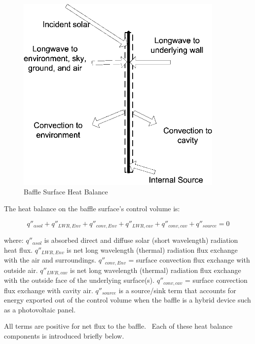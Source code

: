 \begin{figure}[hbtp] %
\centering
\includegraphics[width=0.9\textwidth, height=0.9\textheight, keepaspectratio=true]{media/image438.png}
\caption{  Baffle Surface Heat Balance \protect \label{fig:baffle-surface-heat-balance}}
\end{figure}

The heat balance on the baffle surface's control volume is:

\begin{equation}
{q''_{\alpha sol}} + {q''_{LWR,Env}} + {q''_{conv,Env}} + {q''_{LWR,cav}} + {q''_{conv,cav}} + {q''_{source}} = 0
\end{equation}

where: 
\(q''_{\alpha sol}\) is absorbed direct and diffuse solar (short wavelength) radiation heat flux.
\(q''_{LWR,Env}\) is net long wavelength (thermal) radiation flux exchange with the air and surroundings.
\(q''_{conv,Env}\) = surface convection flux exchange with outside air.
\(q''_{LWR,cav}\) is net long wavelength (thermal) radiation flux exchange with the outside face of the underlying surface(s).
\(q''_{conv,cav}\) = surface convection flux exchange with cavity air.
\({q''_{source}}\) is a source/sink term that accounts for energy exported out of the control volume when the baffle is a hybrid device such as a photovoltaic panel.

All terms are positive for net flux to the baffle.~ Each of these heat balance components is introduced briefly below.


